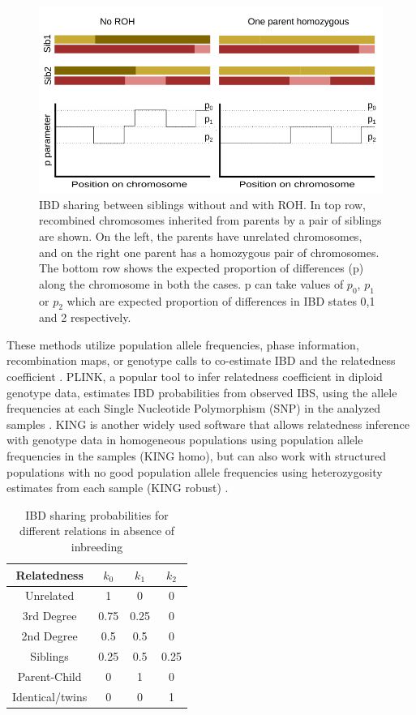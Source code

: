 \documentclass[12pt, letterpaper]{article}
\begin{document}
\begin{figure}[h!]
    \includegraphics[width=18cm]{plots/inkscape_finalImg/schematic_sib.png}
    \centering
    \caption{IBD sharing between siblings without and with ROH. In top row, recombined chromosomes inherited from parents by a pair of siblings are shown. On the left, the parents have unrelated chromosomes, and on the right one parent has a homozygous pair of chromosomes. The bottom row shows the expected proportion of differences (p) along the chromosome in both the cases. p can take values of $p_0$, $p_1$ or $p_2$ which are expected proportion of differences in IBD states 0,1 and 2 respectively.  }
    \label{fig0:schematic}
\end{figure}


These methods utilize population allele frequencies, phase information, recombination maps, or genotype calls to co-estimate IBD and the relatedness coefficient \cite{huff_maximum-likelihood_2011,li_relationship_2014,li_accurate_2014,thornton_estimating_2012}.  PLINK, a popular tool to infer relatedness coefficient in diploid genotype data, estimates IBD probabilities from observed IBS, using the allele frequencies at each Single Nucleotide Polymorphism (SNP) in the analyzed samples \cite{purcell_plink_2007}. KING is another widely used software that allows relatedness inference with genotype data in homogeneous populations using population allele frequencies in the samples (KING homo), but can also work with structured populations with no good population allele frequencies using heterozygosity estimates from each sample (KING robust) \cite{manichaikul_robust_2010}. 

\begin{table}
\caption{\label{tab:Table 1}IBD sharing probabilities for different relations in absence of inbreeding}
\begin{tabular}{|c|c|c|c|}
    \hline
    Relatedness & $k_0$ & $k_1$ & $k_2$\\
    \hline
    Unrelated & 1 & 0 & 0\\
    \hline
    3rd Degree & 0.75 & 0.25 & 0\\
    \hline
    2nd Degree & 0.5 & 0.5 & 0\\
    \hline
    Siblings & 0.25 & 0.5 & 0.25\\
    \hline
    Parent-Child & 0 & 1 & 0\\
    \hline
    Identical/twins & 0 & 0 & 1\\
    \hline
\end{tabular}
\label{table1}
\end{table}
\end{document}
